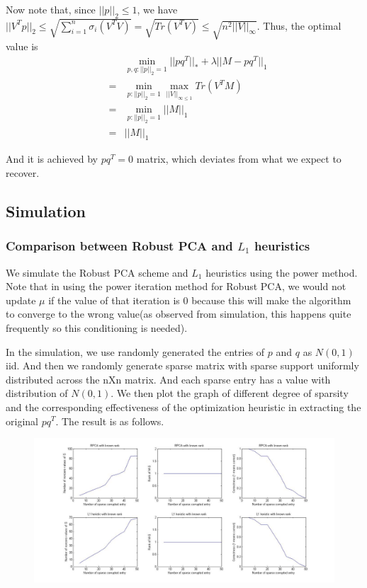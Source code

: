Now note that, since $||p||_{2}\le1$, we have $||V^{T}p||_{2}\le\sqrt{\sum_{i=1}^{n}\sigma_{i}(V^{T}V)}=\sqrt{Tr(V^{T}V)}\le\sqrt{n^{2}||V||_{\infty}}$.
Thus, the optimal value is
\begin{eqnarray*}
 &  & \min_{p,q:||p||_{2}=1}||pq^{T}||_{*}+\lambda||M-pq^{T}||_{1}\\
 & = & \min_{p:||p||_{2}=1}\max_{||V||_{\infty\le1}}Tr(V^{T}M)\\
 & = & \min_{p:||p||_{2}=1}||M||_{1}\\
 & = & ||M||_{1}
\end{eqnarray*}


And it is achieved by $pq^{T}=0$ matrix, which deviates from what
we expect to recover.


\subsection{Simulation }


\subsubsection{Comparison between Robust PCA and $L_{1}$ heuristics}

We simulate the Robust PCA scheme and $L_{1}$ heuristics using the
power method. Note that in using the power iteration method for Robust
PCA, we would not update $\mu$ if the value of that iteration is
0 because this will make the algorithm to converge to the wrong value(as
observed from simulation, this happens quite frequently so this conditioning
is needed).

In the simulation, we use randomly generated the entries of $p$ and
$q$ as $N(0,1)$ iid. And then we randomly generate sparse matrix
with sparse support uniformly distributed across the nXn matrix. And
each sparse entry has a value with distribution of $N(0,1)$. We then
plot the graph of different degree of sparsity and the corresponding
effectiveness of the optimization heuristic in extracting the original
$pq^{T}$. The result is as follows.



\begin{figure}
\label{fig:comparison}
\centering
\includegraphics[width=16cm]{../figures/compare.jpg}
\end{figure}

